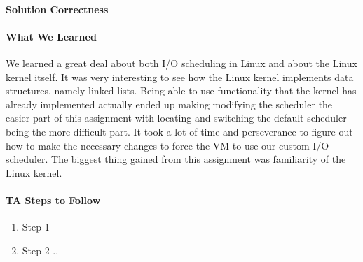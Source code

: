 \documentclass[titlepage,draftclsnofoot,onecolumn]{article}
\begin{document}
\paragraph{Solution Correctness}

\paragraph{What We Learned}
We learned a great deal about both I/O scheduling in Linux and about the Linux kernel itself. It was very interesting to see how the Linux kernel implements data structures, namely linked lists. Being able to use functionality that the kernel has already implemented actually ended up making modifying the scheduler the easier part of this assignment with locating and switching the default scheduler being the more difficult part. It took a lot of time and perseverance to figure out how to make the necessary changes to force the VM to use our custom I/O scheduler. The biggest thing gained from this assignment was familiarity of the Linux kernel.
\paragraph{TA Steps to Follow}

\begin{enumerate}
  \item Step 1
  \item Step 2 ..
\end{enumerate}
\end{document}
